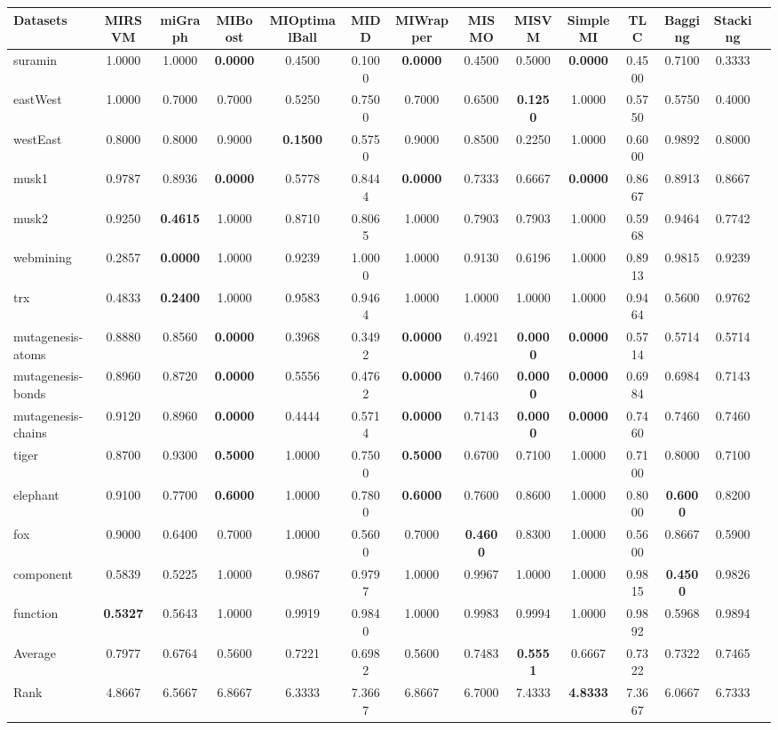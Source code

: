 \begin{threeparttable}
\begin{tabular}{lccccccccccccc}
\toprule
Datasets &MIRSVM &miGraph &MIBoost &MIOptimalBall &MIDD &MIWrapper &MISMO &MISVM &SimpleMI &TLC &Bagging &Stacking \\
\midrule
suramin &1.0000 &1.0000 &\textbf{0.0000} &0.4500 &0.1000 &\textbf{0.0000} &0.4500 &0.5000 &\textbf{0.0000} &0.4500 &0.7100 &0.3333 &  \\
eastWest &1.0000 &0.7000 &0.7000 &0.5250 &0.7500 &0.7000 &0.6500 &\textbf{0.1250} &1.0000 &0.5750 &0.5750 &0.4000 &  \\
westEast &0.8000 &0.8000 &0.9000 &\textbf{0.1500} &0.5750 &0.9000 &0.8500 &0.2250 &1.0000 &0.6000 &0.9892 &0.8000 &  \\
musk1 &0.9787 &0.8936 &\textbf{0.0000} &0.5778 &0.8444 &\textbf{0.0000} &0.7333 &0.6667 &\textbf{0.0000} &0.8667 &0.8913 &0.8667 &  \\
musk2 &0.9250 &\textbf{0.4615} &1.0000 &0.8710 &0.8065 &1.0000 &0.7903 &0.7903 &1.0000 &0.5968 &0.9464 &0.7742 &  \\
webmining &0.2857 &\textbf{0.0000} &1.0000 &0.9239 &1.0000 &1.0000 &0.9130 &0.6196 &1.0000 &0.8913 &0.9815 &0.9239 &  \\
trx &0.4833 &\textbf{0.2400} &1.0000 &0.9583 &0.9464 &1.0000 &1.0000 &1.0000 &1.0000 &0.9464 &0.5600 &0.9762 &  \\
mutagenesis-atoms &0.8880 &0.8560 &\textbf{0.0000} &0.3968 &0.3492 &\textbf{0.0000} &0.4921 &\textbf{0.0000} &\textbf{0.0000} &0.5714 &0.5714 &0.5714 &  \\
mutagenesis-bonds &0.8960 &0.8720 &\textbf{0.0000} &0.5556 &0.4762 &\textbf{0.0000} &0.7460 &\textbf{0.0000} &\textbf{0.0000} &0.6984 &0.6984 &0.7143 &  \\
mutagenesis-chains &0.9120 &0.8960 &\textbf{0.0000} &0.4444 &0.5714 &\textbf{0.0000} &0.7143 &\textbf{0.0000} &\textbf{0.0000} &0.7460 &0.7460 &0.7460 &  \\
tiger &0.8700 &0.9300 &\textbf{0.5000} &1.0000 &0.7500 &\textbf{0.5000} &0.6700 &0.7100 &1.0000 &0.7100 &0.8000 &0.7100 &  \\
elephant &0.9100 &0.7700 &\textbf{0.6000} &1.0000 &0.7800 &\textbf{0.6000} &0.7600 &0.8600 &1.0000 &0.8000 &\textbf{0.6000} &0.8200 &  \\
fox &0.9000 &0.6400 &0.7000 &1.0000 &0.5600 &0.7000 &\textbf{0.4600} &0.8300 &1.0000 &0.5600 &0.8667 &0.5900 &  \\
component &0.5839 &0.5225 &1.0000 &0.9867 &0.9797 &1.0000 &0.9967 &1.0000 &1.0000 &0.9815 &\textbf{0.4500} &0.9826 &  \\
function &\textbf{0.5327} &0.5643 &1.0000 &0.9919 &0.9840 &1.0000 &0.9983 &0.9994 &1.0000 &0.9892 &0.5968 &0.9894 &  \\
\hline
Average &0.7977 &0.6764 &0.5600 &0.7221 &0.6982 &0.5600 &0.7483 &\textbf{0.5551} &0.6667 &0.7322 &0.7322 &0.7465 &  \\
Rank &4.8667 &6.5667 &6.8667 &6.3333 &7.3667 &6.8667 &6.7000 &7.4333 &\textbf{4.8333} &7.3667 &6.0667 &6.7333 &  \\
\bottomrule
\end{tabular}
\end{threeparttable}